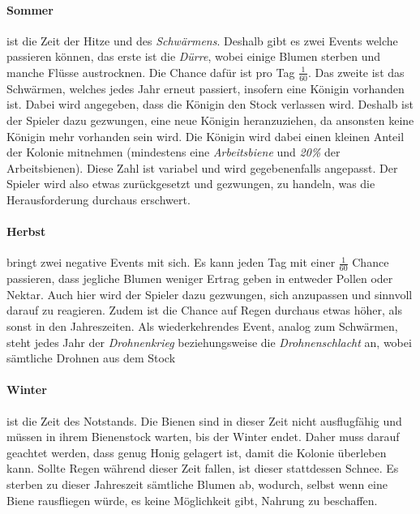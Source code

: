 \paragraph{Sommer} ist die Zeit der Hitze und des \textit{Schwärmens}. Deshalb gibt es zwei Events welche passieren können, das erste ist die \textit{Dürre}, wobei einige Blumen sterben und manche Flüsse austrocknen. Die Chance dafür ist pro Tag $\frac{1}{60}$. Das zweite ist das Schwärmen, welches jedes Jahr erneut passiert, insofern eine Königin vorhanden ist. Dabei wird angegeben, dass die Königin den Stock verlassen wird. Deshalb ist der Spieler dazu gezwungen, eine neue Königin heranzuziehen, da ansonsten keine Königin mehr vorhanden sein wird. Die Königin wird dabei einen kleinen Anteil der Kolonie mitnehmen (mindestens eine \textit{Arbeitsbiene} und \textit{20\%} der Arbeitsbienen). Diese Zahl ist variabel und wird gegebenenfalls angepasst. Der Spieler wird also etwas zurückgesetzt und gezwungen, zu handeln, was die Herausforderung durchaus erschwert. 

\paragraph{Herbst} bringt zwei negative Events mit sich. Es kann jeden Tag mit einer $\frac{1}{60}$ Chance passieren, dass jegliche Blumen weniger Ertrag geben in entweder Pollen oder Nektar. Auch hier wird der Spieler dazu gezwungen, sich anzupassen und sinnvoll darauf zu reagieren. Zudem ist die Chance auf Regen durchaus etwas höher, als sonst in den Jahreszeiten. Als wiederkehrendes Event, analog zum Schwärmen, steht jedes Jahr der \textit{Drohnenkrieg} beziehungsweise die \textit{Drohnenschlacht} an, wobei sämtliche Drohnen aus dem Stock 

\paragraph{Winter} ist die Zeit des Notstands. Die Bienen sind in dieser Zeit nicht ausflugfähig und müssen in ihrem Bienenstock warten, bis der Winter endet. Daher muss darauf geachtet werden, dass genug Honig gelagert ist, damit die Kolonie überleben kann. Sollte Regen während dieser Zeit fallen, ist dieser stattdessen Schnee. Es sterben zu dieser Jahreszeit sämtliche Blumen ab, wodurch, selbst wenn eine Biene rausfliegen würde, es keine Möglichkeit gibt, Nahrung zu beschaffen.


